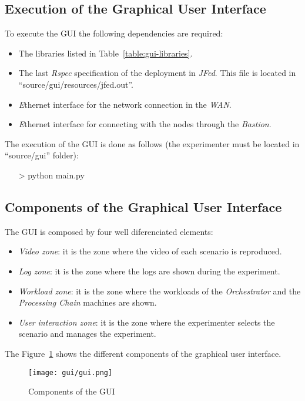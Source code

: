 \subsection{Execution of the Graphical User Interface}

To execute the \ac{GUI} the following dependencies are required:
\begin{itemize}
\item The libraries listed in Table~\ref{table:gui-libraries}. 
\item The last \emph{Rspec} specification of the \vw deployment in \emph{JFed}. This file is located in ``source/gui/resources/jfed.out''.
\item \emph Ethernet interface for the network connection in the \bonfire
  \emph{WAN}.
\item \emph Ethernet interface for connecting with the \vw nodes through the \vw \emph{Bastion}.
\end{itemize}

The execution of the \ac{GUI} is done as follows (the experimenter must be located in ``source/gui'' folder):
\begin{itemize}
\item[>] python main.py
\end{itemize}

\subsection{Components of the Graphical User Interface}

The \acl{GUI} is composed by four well diferenciated elements:
\begin{itemize}
\item \emph{Video zone}: it is the zone where the video of each scenario is reproduced.
\item \emph{Log zone}: it is the zone where the logs are shown during the experiment.
\item \emph{Workload zone}: it is the zone where the workloads of the \emph{Orchestrator} and the \emph{Processing Chain} machines are shown.
\item \emph{User interaction zone}: it is the zone where the experimenter selects the scenario and manages the experiment.
\end{itemize}

The Figure~\ref{fig:gui-components} shows the different components of the graphical user interface.
\begin{figure}[!h]
\begin{center}
\texttt{[image: gui/gui.png]}
\caption{Components of the GUI}
\label{fig:gui-components}
\end{center}
\end{figure}



 





